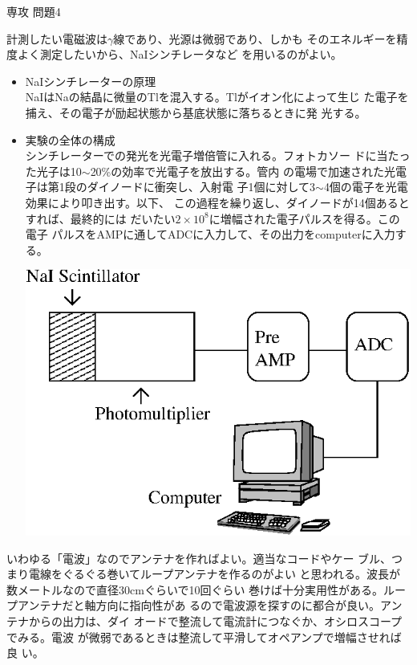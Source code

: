 \documentclass[fleqn]{jbook}
\begin{document}
\begin{answer}{専攻 問題4}{}
\begin{subanswers}
\SubAnswer
計測したい電磁波は$\gamma$線であり、光源は微弱であり、しかも
そのエネルギーを精度よく測定したいから、NaIシンチレータなど
を用いるのがよい。
\begin{itemize}
\item NaIシンチレーターの原理\\
      NaIはNaの結晶に微量のTlを混入する。Tlがイオン化によって生じ
      た電子を捕え、その電子が励起状態から基底状態に落ちるときに発
      光する。
\item 実験の全体の構成\\
      シンチレーターでの発光を光電子増倍管に入れる。フォトカソー
      ドに当たった光子は10$\sim$20\%の効率で光電子を放出する。管内
      の電場で加速された光電子は第1段のダイノードに衝突し、入射電
      子1個に対して3$\sim$4個の電子を光電効果により叩き出す。以下、
      この過程を繰り返し、ダイノードが14個あるとすれば、最終的には
      だいたい$2\times 10^8$に増幅された電子パルスを得る。この電子
      パルスをAMPに通してADCに入力して、その出力をcomputerに入力す
      る。\\
      \begin{center}
       \leavevmode
%       
       \includegraphics[clip]{1998phy4-1.eps}
      \end{center}
\end{itemize}

\SubAnswer
 いわゆる「電波」なのでアンテナを作ればよい。適当なコードやケー
 ブル、つまり電線をぐるぐる巻いてループアンテナを作るのがよい
 と思われる。波長が数メートルなので直径30cmぐらいで10回ぐらい
 巻けば十分実用性がある。ループアンテナだと軸方向に指向性があ
 るので電波源を探すのに都合が良い。アンテナからの出力は、ダイ
 オードで整流して電流計につなぐか、オシロスコープでみる。電波
 が微弱であるときは整流して平滑してオペアンプで増幅させれば良
 い。


\end{subanswers}
\end{answer}
\end{document}
